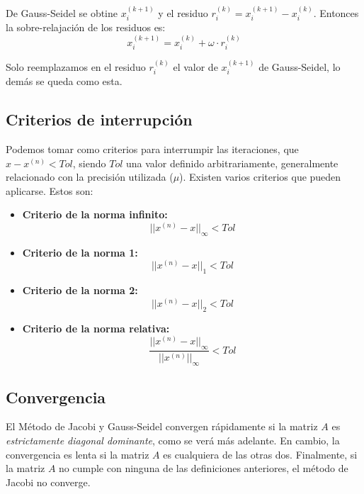 \documentclass[../main.tex]{subfiles}
\begin{document}
        De Gauss-Seidel se obtine $x_i^{(k+1)}$ y el residuo $r_i^{(k)} = x_i^{(k+1)} - x_i^{(k)}$. Entonces la sobre-relajación de los residuos es:
        \begin{equation}
            x_{i}^{(k+1)} = x_i^{(k)} + \omega \cdot r_i^{(k)}
        \end{equation}

        Solo reemplazamos en el residuo $r_i^{(k)}$ el valor de $x_i^{(k+1)}$ de Gauss-Seidel, lo demás se queda como esta.\\

    \subsection{Criterios de interrupción}
        Podemos tomar como criterios para interrumpir las iteraciones, que $x-x^{(n)} < Tol$, siendo $Tol$ una valor definido arbitrariamente, generalmente relacionado con la precisión utilizada ($\mu$). Existen varios criterios que pueden aplicarse. Estos son:
        \begin{itemize}
            \item \textbf{Criterio de la norma infinito:}
                \begin{equation}
                    ||x^{(n)} - x||_{\infty} < Tol
                \end{equation}
            \item \textbf{Criterio de la norma 1:}
                \begin{equation}
                    ||x^{(n)} - x||_{1} < Tol
                \end{equation}
            \item \textbf{Criterio de la norma 2:}
                \begin{equation}
                    ||x^{(n)} - x||_{2} < Tol
                \end{equation}
            \item \textbf{Criterio de la norma relativa:}
                \begin{equation}
                    \frac{||x^{(n)} - x||_{\infty}}{||x^{(n)}||_{\infty}} < Tol
                \end{equation}
        \end{itemize}

    \subsection{Convergencia}
        El Método de Jacobi y Gauss-Seidel convergen rápidamente si la matriz $A$ es \textit{estrictamente diagonal dominante}, como se verá más adelante. En cambio, la convergencia es lenta si la matriz $A$ es cualquiera de las otras dos. Finalmente, si la matriz $A$ no cumple con ninguna de las definiciones anteriores, el método de Jacobi no converge.
\end{document}
